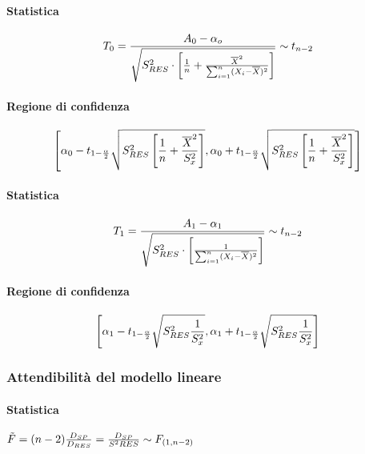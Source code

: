 \documentclass[12pt]{article}
\begin{document}
    \paragraph{Statistica}
    $$T_0 = {{A_0 - \alpha_o}\over{\sqrt{S^2_{RES}\cdot\left[{1\over n}+ {\overline{X}^2 \over \sum_{i=1}^n(X_i - \overline{X})^2}\right]}}} \sim t_{n-2}$$ 
    \paragraph{Regione di confidenza}
    $$\left[\alpha_0 - t_{1-{\alpha \over 2}}\sqrt{S^2_{RES}\left[{1 \over n} + {\overline{X}^2 \over S_x^2}\right]}, \alpha_0 + t_{1-{\alpha \over 2}}\sqrt{S^2_{RES}\left[{1 \over n} + {\overline{X}^2 \over S_x^2}\right]} \right]$$
    \paragraph{Statistica}
    $$T_1 = {{A_1 - \alpha_1}\over{\sqrt{S^2_{RES}\cdot\left[{1 \over \sum_{i=1}^n(X_i - \overline{X})^2}\right]}}} \sim t_{n-2}$$ 
    \paragraph{Regione di confidenza}
    $$\left[\alpha_1 - t_{1-{\alpha \over 2}}\sqrt{S^2_{RES}{1 \over S_x^2}}, \alpha_1 + t_{1-{\alpha \over 2}}\sqrt{S^2_{RES}{1 \over S_x^2}} \right]$$
    \subsubsection{Attendibilità del modello lineare}
    \paragraph{Statistica} $\tilde{F}=(n-2){D_{SP} \over D_{RES}}= {D_{SP} \over S^2{RES}} \sim F_{(1, n-2)}$
    \newpage
\end{document}
